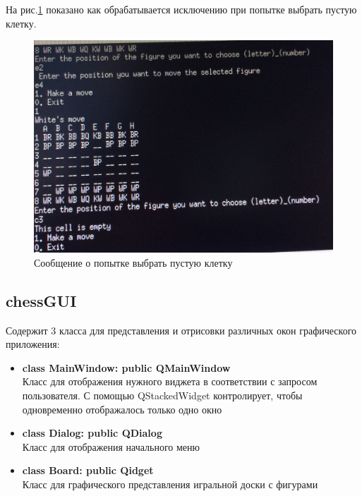 На рис.\ref{pic:CUIemptyCell} показано как обрабатывается исключению при попытке выбрать пустую клетку.\\
\begin{figure}[H]
	\begin{center}
		\includegraphics[scale=0.1]{pics/cui1.jpg}
		\caption{Сообщение о попытке выбрать пустую клетку} 
		\label{pic:CUIemptyCell} %
	\end{center}
\end{figure}

\subsection*{chessGUI}
Содержит 3 класса для представления и отрисовки различных окон графического приложения:
\begin{itemize}
\item\textbf{class MainWindow: public QMainWindow}\\
Класс для отображения нужного виджета в соответствии с запросом пользователя. С помощью QStackedWidget контролирует, чтобы одновременно отображалось только одно окно\\
\item\textbf{class Dialog: public QDialog}\\
Класс для отображения начального меню\\
\item\textbf{class Board: public Qidget}\\
Класс для графического представления игральной доски с фигурами\\
\end{itemize}

